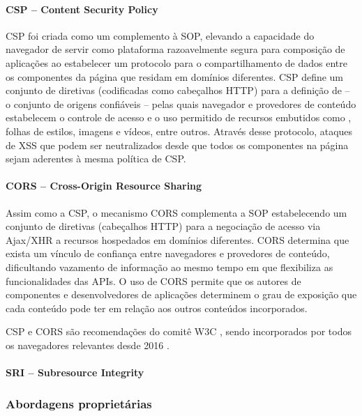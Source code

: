\paragraph{CSP -- Content Security Policy}
CSP foi criada como um complemento à SOP, elevando a capacidade do navegador de servir como plataforma razoavelmente segura para composição de aplicações  ao estabelecer um protocolo para o compartilhamento de dados entre os componentes da página que residam em domínios diferentes. CSP define um conjunto de diretivas (codificadas como cabeçalhos HTTP) para a definição de  -- o conjunto de origens confiáveis -- pelas quais navegador e provedores de conteúdo estabelecem o controle de acesso e o uso permitido de recursos embutidos como {\scripts}, folhas de estilos, imagens e vídeos, entre outros. Através desse protocolo, ataques de XSS que podem ser neutralizados desde que todos os componentes na página sejam aderentes à mesma política de CSP.

\paragraph{CORS -- Cross-Origin Resource Sharing}
Assim como a CSP, o mecanismo CORS \cite{W3C:CORS} complementa a SOP estabelecendo um conjunto de diretivas (cabeçalhos HTTP) para a negociação de acesso via Ajax/XHR a recursos hospedados em domínios diferentes. CORS determina que exista um vínculo de confiança entre navegadores e provedores de conteúdo, dificultando vazamento de informação ao mesmo tempo em que flexibiliza as funcionalidades das APIs. O uso de CORS permite que os autores de componentes e desenvolvedores de aplicações  determinem o grau de exposição que cada conteúdo pode ter em relação aos outros conteúdos incorporados.

CSP e CORS são recomendações do comitê W3C \cite{W3C:CSP} \cite{W3C:CORS}, sendo incorporados por todos os navegadores relevantes desde 2016 \cite{CanIUse:CSP} \cite{CanIUse:CORS}.

\paragraph{SRI -- Subresource Integrity}



\subsubsection{Abordagens proprietárias}


